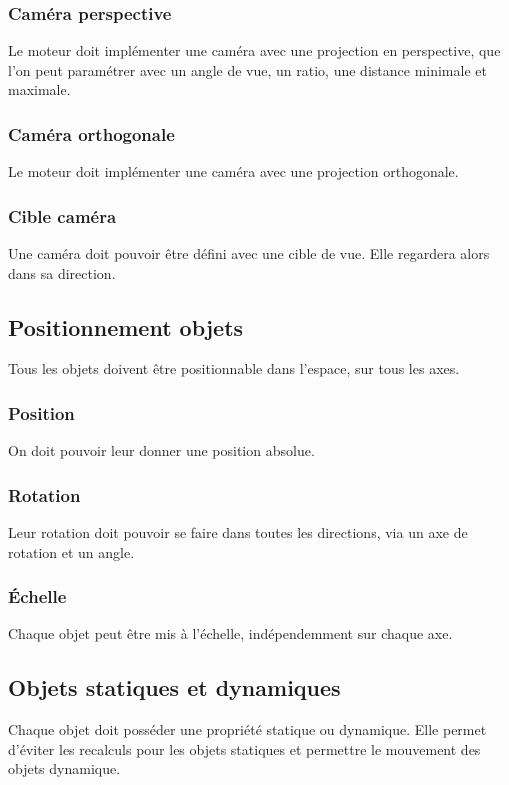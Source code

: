\documentclass [a4 paper,11pt]{article}
\begin{document}
\subsubsection*{Caméra perspective}
Le moteur doit implémenter une caméra avec une projection en perspective, que l'on peut paramétrer avec un angle de vue,
un ratio, une distance minimale et maximale.

\subsubsection*{Caméra orthogonale}
Le moteur doit implémenter une caméra avec une projection orthogonale.

\subsubsection*{Cible caméra}
Une caméra doit pouvoir être défini avec une cible de vue.
Elle regardera alors dans sa direction.

\subsection{Positionnement objets}
Tous les objets doivent être positionnable dans l'espace, sur tous les axes.

\subsubsection*{Position}
On doit pouvoir leur donner une position absolue.

\subsubsection*{Rotation}
Leur rotation doit pouvoir se faire dans toutes les directions, via un axe de rotation et un angle.

\subsubsection*{Échelle}
Chaque objet peut être mis à l'échelle, indépendemment sur chaque axe.

\subsection{Objets statiques et dynamiques}
Chaque objet doit posséder une propriété statique ou dynamique.
Elle permet d'éviter les recalculs pour les objets statiques et permettre le mouvement des objets dynamique.
\end{document}

